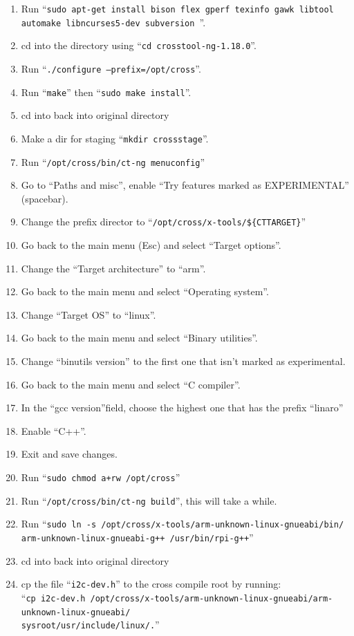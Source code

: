 \documentclass{article}
\begin{document}
\begin{enumerate}
    \item Run ``{\tt sudo apt-get install bison flex gperf texinfo gawk libtool automake libncurses5-dev subversion
    }''.
    \item cd into the directory using ``{\tt cd crosstool-ng-1.18.0}''.
    \item Run ``{\tt ./configure --prefix=/opt/cross}''.
    \item Run ``{\tt make}'' then ``{\tt sudo make install}''.
    \item cd into back into original directory
    \item Make a dir for staging ``{\tt mkdir cross\textunderscore stage}''.
    \item Run ``{\tt /opt/cross/bin/ct-ng menuconfig}''
    \item Go to ``Paths and misc'', enable ``Try features marked as EXPERIMENTAL'' (spacebar).
    \item Change the prefix director to ``{\tt /opt/cross/x-tools/\$\{CT\textunderscore TARGET\}}''
    \item Go back to the main menu (Esc) and select ``Target options''.
    \item Change the ``Target architecture'' to ``arm''.
    \item Go back to the main menu and select ``Operating system''.
    \item Change ``Target OS'' to ``linux''.
    \item Go back to the main menu and select ``Binary utilities''.
    \item Change ``binutils version'' to the first one that isn't marked as experimental.
    \item Go back to the main menu and select ``C compiler''.
    \item In the ``gcc version''field, choose the highest one that has the prefix ``linaro''
    \item Enable ``C++''.
    \item Exit and save changes.
    \item Run ``{\tt sudo chmod a+rw /opt/cross}''
    \item Run ``{\tt /opt/cross/bin/ct-ng build}'', this will take a while.
    \item Run ``{\tt sudo ln -s /opt/cross/x-tools/arm-unknown-linux-gnueabi/bin/ \\ arm-unknown-linux-gnueabi-g++ /usr/bin/rpi-g++}''
    \item cd into back into original directory
    \item cp the file ``{\tt i2c-dev.h}'' to the cross compile root by running: \\
    ``{\tt cp i2c-dev.h /opt/cross/x-tools/arm-unknown-linux-gnueabi/arm-unknown-linux-gnueabi/ \\ sysroot/usr/include/linux/.}''
\end{enumerate}
\end{document}
